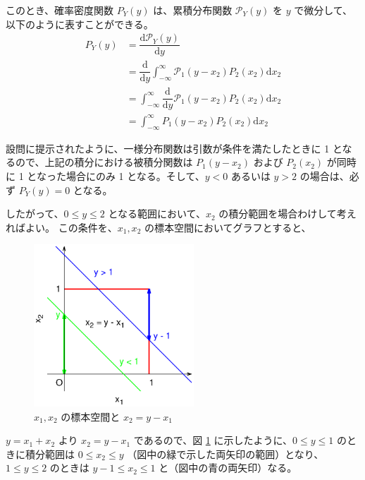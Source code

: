 \documentclass[uplatex,dvipdfmx,a4paper,11pt]{jsarticle}
\newcommand{\diff}{\mathrm d}
\newcommand{\difd}[2]{\dfrac{\diff #1}{\diff #2}}
\begin{document}
\begin{enumerate}
このとき、確率密度関数 $P_Y(y)$ は、累積分布関数 $\mathcal{P}_Y(y)$ を $y$ で微分して、以下のように表すことができる。
\begin{align*}
P_Y(y)
	&=\difd{\mathcal{P}_Y (y)}{y} \\ 
	&=\difd{}{y} \int_{-\infty}^{\infty} \mathcal{P}_1(y-x_2) P_2(x_2) \diff x_2 \\
	&=\int_{-\infty}^{\infty} \difd{}{y} \mathcal{P}_1(y-x_2) P_2(x_2) \diff x_2 \\
	&=\int_{-\infty}^{\infty} P_1(y-x_2) P_2(x_2) \diff x_2
\end{align*}


設問に提示されたように、一様分布関数は引数が条件を満たしたときに 1 となるので、上記の積分における被積分関数は $P_1(y - x_2)$ および $P_2(x_2)$ が同時に 1 となった場合にのみ 1 となる。そして、$y < 0$ あるいは $y>2$ の場合は、必ず $P_Y(y) = 0$ となる。

したがって、$0 \leq y \leq 2$ となる範囲において、$x_2$ の積分範囲を場合わけして考えればよい。
この条件を、$x_1, x_2$ の標本空間においてグラフとすると、
\begin{figure}[htb]
	\centering
	    \includegraphics[width=6cm]{./figures/uni_jyouken.eps}
		\caption{$x_1, x_2$ の標本空間と $x_2 = y - x_1$}
		\label{fig:uni_jouken}
\end{figure}



$y = x_1 + x_2$ より $x_2 = y - x_1$ であるので、図 \ref{fig:uni_jouken} に示したように、$0 \leq y \leq 1$ のときに積分範囲は $0 \leq x_2 \leq y$ （図中の緑で示した両矢印の範囲）となり、$1 \leq y \leq 2$ のときは $y − 1 \leq x_2 \leq 1$ と（図中の青の両矢印）なる。


\end{enumerate}
\end{document}
